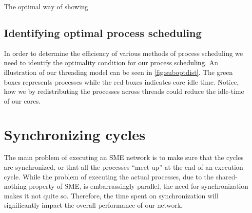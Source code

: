 

The optimal way of showing 

\subsection{Identifying optimal process scheduling}
In order to determine the efficiency of various methods of process
scheduling we need to identify the optimality condition for our
process scheduling. An illustration of our threading model can be seen in
\cref{fig:suboptdist}. The green boxes represents processes while the
red boxes indicates core idle time. Notice, how we by redistributing
the processes across threads could reduce the idle-time of our
cores.


\section{Synchronizing cycles}
The main problem of executing an SME network is to make sure that the
cycles are synchronized, or that all the processes ``meet up'' at the
end of an execution cycle. While the problem of executing the actual
processes, due to the shared-nothing property of SME, is embarrassingly
parallel, the need for synchronization makes it not quite
so. Therefore, the time spent on synchronization will significantly
impact the overall performance of our network.


